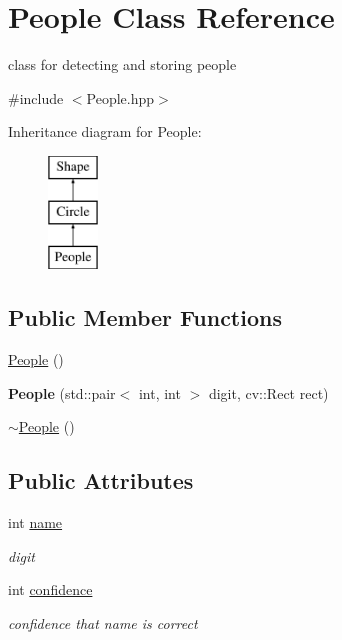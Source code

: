 \hypertarget{class_people}{}\section{People Class Reference}
\label{class_people}


class for detecting and storing people  




{\ttfamily \#include $<$People.\+hpp$>$}

Inheritance diagram for People\+:\begin{figure}[H]
\begin{center}
\leavevmode
\includegraphics[height=3.000000cm]{class_people}
\end{center}
\end{figure}
\subsection*{Public Member Functions}
\begin{DoxyCompactItemize}
\item 
\mbox{\hyperlink{class_people_aae1408eddfd15a5007003ecdf1507941}{People}} ()
\item 
\mbox{\label{class_people_abfabd2f2e27a7aa269d404e8f27f903e}} 
{\bfseries People} (std\+::pair$<$ int, int $>$ digit, cv\+::\+Rect rect)
\item 
\mbox{\hyperlink{class_people_adae124857f64dadff4e1801410b3dab2}{$\sim$\+People}} ()
\end{DoxyCompactItemize}
\subsection*{Public Attributes}
\begin{DoxyCompactItemize}
\item 
\mbox{\label{class_people_a06e995c8c3b9808db931bedb44d782c8}} 
int \mbox{\hyperlink{class_people_a06e995c8c3b9808db931bedb44d782c8}{name}}
\begin{DoxyCompactList}\small\item\em digit \end{DoxyCompactList}\item 
\mbox{\label{class_people_a44d79c52132068763c91e308e9685e06}} 
int \mbox{\hyperlink{class_people_a44d79c52132068763c91e308e9685e06}{confidence}}
\begin{DoxyCompactList}\small\item\em confidence that name is correct \end{DoxyCompactList}\end{DoxyCompactItemize}


